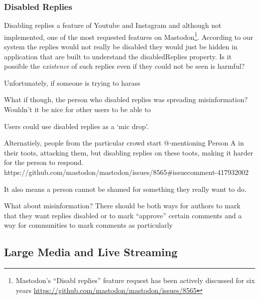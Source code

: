 \subsubsection{Disabled Replies}

Disabling replies a feature of Youtube and Instagram and although not
implemented, one of the most requested features on Mastodon\footnote{
    Mastodon's ``Disabl replies'' feature request has been actively discussed
    for six years
    \url{https://github.com/mastodon/mastodon/issues/8565}
}.
According to our system the replies would not really be disabled
they would just be hidden in application that are built to understand
the disabledReplies property.
Is it possible the \emph{existence} of such replies even if they could
not be seen is harmful?

Unfortunately, if someone is trying to harass

What if though, the person who disabled replies was spreading misinformation?
Wouldn't it be nice for other users to be able to

Users could use disabled replies as a `mic drop'.

Alternatiely,
people from the particular crowd start
@-mentioning Person A in their toots, attacking them,
but disabling replies on these toots, making it harder
for the person to respond.
https://github.com/mastodon/mastodon/issues/8565#issuecomment-417932002

It also means a person cannot be shamed for something they really
want to do.

What about misinformation? There should be both ways for authors to
mark that they want replies disabled or to mark ``approve'' certain comments
and a way for communities to
mark comments as particularly

\subsection{Large Media and Live Streaming}
